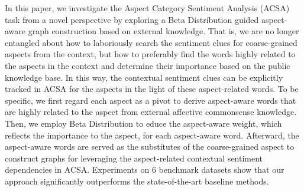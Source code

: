 In this paper, we investigate the Aspect Category Sentiment Analysis (ACSA) task from a novel perspective by exploring a Beta Distribution guided aspect-aware graph construction based on external knowledge. That is, we are no longer entangled about how to laboriously search the sentiment clues for coarse-grained aspects from the context, but how to preferably find the words highly related to the aspects in the context and determine their importance based on the public knowledge base. In this way, the contextual sentiment clues can be explicitly tracked in ACSA for the aspects in the light of these aspect-related words. To be specific, we first regard each aspect as a pivot to derive aspect-aware words that are highly related to the aspect from external affective commonsense knowledge. Then, we employ Beta Distribution to educe the aspect-aware weight, which reflects the importance to the aspect, for each aspect-aware word. Afterward, the aspect-aware words are served as the substitutes of the coarse-grained aspect to construct graphs for leveraging the aspect-related contextual sentiment dependencies in ACSA. Experiments on 6 benchmark datasets show that our approach significantly outperforms the state-of-the-art baseline methods.

